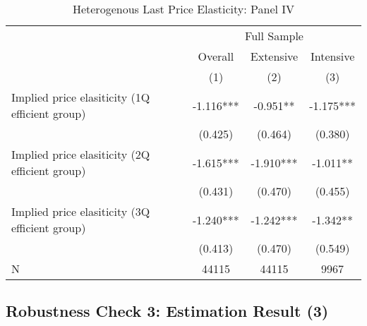 \documentclass[ review  , 3p ]{elsarticle}
\begin{document}
  \begin{table}

  \caption{\label{tab:kableHeteroShortElasticitySlide2}Heterogenous Last Price Elasticity: Panel IV}
  \centering
  \fontsize{8}{10}\selectfont
  \begin{tabular}[t]{lccc}
  \toprule
  \multicolumn{1}{c}{ } & \multicolumn{3}{c}{Full Sample} \\
  \cmidrule(l{3pt}r{3pt}){2-4}
  \multicolumn{1}{c}{ } & \multicolumn{1}{c}{Overall} & \multicolumn{1}{c}{Extensive} & \multicolumn{1}{c}{Intensive} \\
  \cmidrule(l{3pt}r{3pt}){2-2} \cmidrule(l{3pt}r{3pt}){3-3} \cmidrule(l{3pt}r{3pt}){4-4}
   & (1) & (2) & (3)\\
  \midrule
  Implied price elasiticity (1Q efficient group) & -1.116*** & -0.951** & -1.175***\\
   & (0.425) & (0.464) & (0.380)\\
  Implied price elasiticity (2Q efficient group) & -1.615*** & -1.910*** & -1.011**\\
   & (0.431) & (0.470) & (0.455)\\
  Implied price elasiticity (3Q efficient group) & -1.240*** & -1.242*** & -1.342**\\
   & (0.413) & (0.470) & (0.549)\\
  N & 44115 & 44115 & 9967\\
  \bottomrule
  \end{tabular}
  \end{table}

  \hypertarget{robustness-check-3-estimation-result-3}{%
  \subsection{Robustness Check 3: Estimation Result (3)}\label{robustness-check-3-estimation-result-3}}
\end{document}
